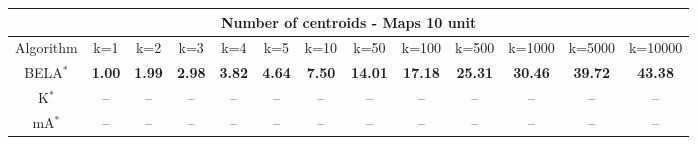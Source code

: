 \begin{tabular}{c|cccccccccccc}\toprule
\multicolumn{13}{c}{Number of centroids - Maps 10 unit}\\ \midrule
Algorithm & k=1 & k=2 & k=3 & k=4 & k=5 & k=10 & k=50 & k=100 & k=500 & k=1000 & k=5000 & k=10000 \\ \midrule
BELA$^*$ & \textbf{1.00} & \textbf{1.99} & \textbf{2.98} & \textbf{3.82} & \textbf{4.64} & \textbf{7.50} & \textbf{14.01} & \textbf{17.18} & \textbf{25.31} & \textbf{30.46} & \textbf{39.72} & \textbf{43.38} \\
K$^*$ & -- & -- & -- & -- & -- & -- & -- & -- & -- & -- & -- & -- \\
mA$^*$ & -- & -- & -- & -- & -- & -- & -- & -- & -- & -- & -- & -- \\ \bottomrule 
\end{tabular}

